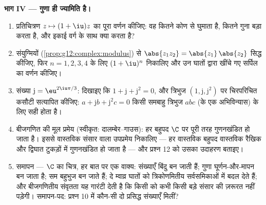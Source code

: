 \begin{problem}
\medskip
\noindent\textbf{भाग IV --- गुणा ही ज्यामिति है।}
\begin{enumerate}[resume]
  \item प्रतिचित्रण $z \mapsto (1 + \iu)z$ का पूरा वर्णन कीजिए: वह कितने कोण से घुमाता है,
        कितने गुना बड़ा करता है, और इकाई वर्ग के साथ क्या करता है?
  \item संयुग्मियों (\cref{prop:g12:complex:modulus}) से $\abs{z_1 z_2} = \abs{z_1}\,\abs{z_2}$ सिद्ध कीजिए, फिर $n = 1, 2, 3, 4$ के लिए $(1+\iu)^n$
        निकालिए और उन घातों द्वारा खींचे गए सर्पिल का वर्णन कीजिए।
  \item संख्या $\mathrm{j} = \eu^{2\iu\pi/3}$: दिखाइए कि $1 + \mathrm{j} + \mathrm{j}^2 = 0$, और त्रिभुज $\left(1, \mathrm{j}, \mathrm{j}^2\right)$ पर चिरपरिचित कसौटी
        सत्यापित कीजिए: $a + \mathrm{j} b + \mathrm{j}^2 c = 0$ किसी समबाहु त्रिभुज $abc$ (के एक अभिविन्यास)
        के लिए सही होता है।
  \item बीजगणित की मूल प्रमेय (स्वीकृत: दालम्बेर--गाउस): हर बहुपद $\C$ पर
        पूरी तरह गुणनखंडित हो जाता है। इससे वास्तविक संसार वाला उपप्रमेय
        निकालिए --- हर वास्तविक बहुपद वास्तविक रैखिक और द्विघात टुकड़ों में
        गुणनखंडित हो जाता है --- और प्रश्न 12 को उसका उदाहरण बताइए।
  \item समापन --- $\C$ का चित्र, हर बात पर एक वाक्य: संख्याएँ बिंदु बन जाती
        हैं; गुणा घूर्णन-और-मापन बन जाता है;  सम बहुभुज बन जाते
        हैं; दे म्वाव्र घातों को त्रिकोणमितीय सर्वसमिकाओं में बदल देते हैं;
        और बीजगणितीय संवृतता यह गारंटी देती है कि किसी  को कभी किसी
        बड़े संसार की ज़रूरत नहीं पड़ेगी। समापन-पद: प्रश्न 10 में कौन-सी दो
        प्रसिद्ध संख्याएँ मिलीं?
\end{enumerate}
\end{problem}
